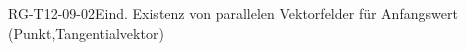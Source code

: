 
\begin{PROP}{RG-T12-09-02}{Eind. Existenz von parallelen Vektorfelder für Anfangswert (Punkt,Tangentialvektor)}
\end{PROP}
